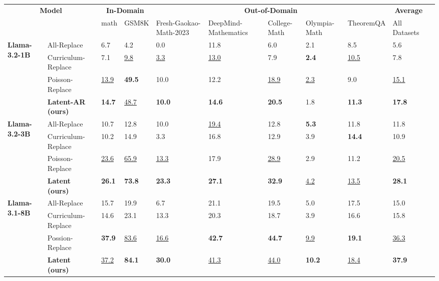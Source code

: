 \begin{table*}[t]
\begin{adjustbox}{width=\textwidth}
\begin{tabular}{lllllllllll}
\toprule
\multicolumn{2}{c}{\multirow{2}{*}{\bf Model}} & \multicolumn{2}{c}{\bf In-Domain} & \multicolumn{5}{c}{\bf Out-of-Domain} & \multicolumn{1}{c}{\bf Average} \\ \cmidrule(lr){3-4} \cmidrule(lr){5-9} \cmidrule(lr){10-10}
& & math & GSM8K & Fresh-Gaokao-Math-2023 & DeepMind-Mathematics & College-Math & Olympia-Math & TheoremQA & All Datasets \\ \midrule
\multirow{3}{*}{\bf Llama-3.2-1B}

& {All-Replace} & 6.7 & 4.2 & 0.0 & 11.8 & 6.0 & {2.1} & 8.5 & 5.6 \\
& {Curriculum-Replace} & {7.1} & \underline{9.8} & \underline{3.3} & \underline{13.0} & 
{7.9} & \bf{2.4} & \underline{10.5} & {7.8} \\
& Poisson-Replace & \underline{13.9 } & \textbf{49.5} & {10.0}  & {12.2}  & \underline{18.9 } & \underline{2.3}  & {9.0 }  & \underline{15.1 }   \\
& \textbf{Latent-AR (ours)} & \textbf{14.7 } & \underline{48.7 } & \textbf{10.0}  & \textbf{14.6 }  & \textbf{20.5} & 1.8  & \textbf{11.3 }  & \textbf{17.8 }   \\


\midrule
\multirow{3}{*}{\bf Llama-3.2-3B}

& {All-Replace} & {10.7} & 12.8 & {10.0} & \underline{19.4} & 12.8 & \bf{5.3} & 11.8 & {11.8} \\
& {Curriculum-Replace} & 10.2 & {14.9} & 3.3 & 16.8 & {12.9} & 3.9 & \bf{14.4} & 10.9 \\
& Poisson-Replace & \underline{23.6 } & \underline{65.9 } & \underline{13.3}  & {17.9 }  & \underline{28.9 } & 2.9  & {11.2 }  & \underline{20.5 }   \\
& \textbf{Latent (ours)} & \textbf{26.1 }  & \textbf{73.8 }  & \textbf{23.3 }  & \textbf{27.1 }  & \textbf{32.9 }  & \underline{4.2}  & \underline{13.5}   & \textbf{28.1 } \\



\midrule
\multirow{3}{*}{\bf Llama-3.1-8B}

& {All-Replace} & {15.7} & 19.9 & 6.7 & {21.1} & {19.5} & {5.0} & {17.5} & 15.0 \\
& {Curriculum-Replace} & 14.6 & {23.1} & {13.3} & 20.3 & 18.7 & 3.9 & 16.6 & {15.8} \\
& Possion-Replace & \textbf{37.9 } & \underline{83.6 }  & \underline{16.6 }  & \textbf{42.7 }  & \textbf{44.7 }  & \underline{9.9 }  & \textbf{19.1 }  & \underline{36.3 }  \\
& \textbf{Latent (ours)} & \underline{37.2 } & \textbf{84.1 }  & \textbf{30.0 }  & \underline{41.3 }  & \underline{44.0 }  & \textbf{10.2 }  & \underline{18.4 }  & \textbf{37.9 }  \\





\end{tabular}
\end{adjustbox}
\end{table*}
